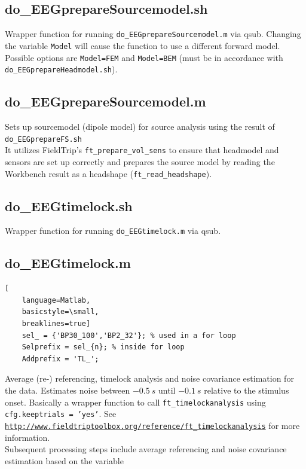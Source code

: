 \documentclass[12pt,a4paper]{scrartcl}
\begin{document}
\subsection{do\_EEGprepareSourcemodel.sh}
\label{sec:prepSM}
Wrapper function for running \texttt{do\_EEGprepareSourcemodel.m} via qsub. Changing the variable \texttt{Model} will cause the function to use a different forward model. Possible options are \texttt{Model=FEM} and \texttt{Model=BEM} (must be in accordance with \texttt{do\_EEGprepareHeadmodel.sh}).

\subsection{do\_EEGprepareSourcemodel.m}
Sets up sourcemodel (dipole model) for source analysis using the result of \texttt{do\_EEGprepareFS.sh}\\
\noindent It utilizes FieldTrip's \texttt{ft\_prepare\_vol\_sens} to ensure that headmodel and sensors are set up correctly and prepares the source model by reading the Workbench result as a headshape (\texttt{ft\_read\_headshape}).

\subsection{do\_EEGtimelock.sh}
\label{sec:timelock}
Wrapper function for running \texttt{do\_EEGtimelock.m} via qsub.

\subsection{do\_EEGtimelock.m}
\begin{lstlisting}[
    language=Matlab,
    basicstyle=\small,
    breaklines=true]
    sel_ = {'BP30_100','BP2_32'}; % used in a for loop
    Selprefix = sel_{n}; % inside for loop
    Addprefix = 'TL_';
\end{lstlisting}
Average (re-) referencing, timelock analysis and noise covariance estimation for the data. Estimates noise between $-0.5~s$ until $-0.1~s$ relative to the stimulus onset. Basically a wrapper function to call \texttt{ft\_timelockanalysis} using \texttt{cfg.keeptrials = 'yes'}. See \href{http://www.fieldtriptoolbox.org/reference/ft\_timelockanalysis}{\nolinkurl{http://www.fieldtriptoolbox.org/reference/ft\_timelockanalysis}} for more information.\\

\noindent Subsequent processing steps include average referencing and noise covariance estimation based on the variable 
\end{document}
